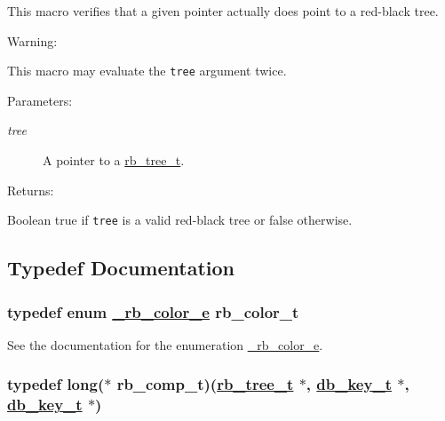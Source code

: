 This macro verifies that a given pointer actually does point to a red-black tree.

\begin{Desc}
\item[Warning: ]\par
This macro may evaluate the {\tt tree} argument twice.\end{Desc}
\begin{Desc}
\item[Parameters: ]\par
\begin{description}
\item[{\em 
tree}]A pointer to a \hyperlink{group__dbprim__rbtree_a0}{rb\_\-tree\_\-t}.\end{description}
\end{Desc}
\begin{Desc}
\item[Returns: ]\par
Boolean true if {\tt tree} is a valid red-black tree or false otherwise. \end{Desc}


\subsection{Typedef Documentation}
\hypertarget{group__dbprim__rbtree_a4}{
\subsubsection[rb\_\-color\_\-t]{\setlength{\rightskip}{0pt plus 5cm}typedef enum \hyperlink{group__dbprim__rbtree_a38}{\_\-rb\_\-color\_\-e} rb\_\-color\_\-t}}
\label{group__dbprim__rbtree_a4}


See the documentation for the enumeration \hyperlink{group__dbprim__rbtree_a38}{\_\-rb\_\-color\_\-e}. \hypertarget{group__dbprim__rbtree_a3}{
\subsubsection[rb\_\-comp\_\-t]{\setlength{\rightskip}{0pt plus 5cm}typedef long($\ast$ rb\_\-comp\_\-t)(\hyperlink{group__dbprim__rbtree_a0}{rb\_\-tree\_\-t} $\ast$, \hyperlink{group__dbprim_a0}{db\_\-key\_\-t} $\ast$, \hyperlink{group__dbprim_a0}{db\_\-key\_\-t} $\ast$)}}
\label{group__dbprim__rbtree_a3}


